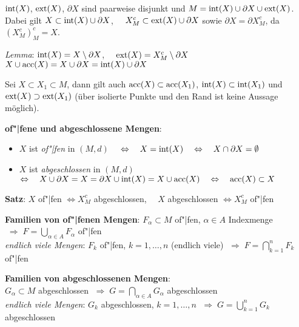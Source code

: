 \linie

$\operatorname{int}(X)$, $\operatorname{ext}(X)$, $\partial X$ sind paarweise disjunkt und
$M = \operatorname{int}(X) \cup \partial X \cup \operatorname{ext}(X)$. \\
Dabei gilt $X \subset \operatorname{int}(X) \cup \partial X$,
$\quad X_M^c \subset \operatorname{ext}(X) \cup \partial X$ \quad sowie
$\partial X = \partial X_M^c$, da $(X_M^c)_M^c = X$.

\emph{Lemma}: $\operatorname{int}(X) = X \setminus \partial X$,
$\quad\operatorname{ext}(X) = X_M^c \setminus \partial X$ \\
$X \cup \operatorname{acc}(X) = X \cup \partial X = \operatorname{int}(X) \cup \partial X$

Sei $X \subset X_1 \subset M$, dann gilt auch $\operatorname{acc}(X) \subset \operatorname{acc}(X_1)$,
$\operatorname{int}(X) \subset \operatorname{int}(X_1)$ und
$\operatorname{ext}(X) \supset \operatorname{ext}(X_1)$
(über isolierte Punkte und den Rand ist keine Aussage möglich).

\linie
\pagebreak

\textbf{of"|fene und abgeschlossene Mengen}:

\begin{itemize}
    \item $X$ ist \emph{of"|fen} in $(M,d)$
    $\quad\Leftrightarrow\quad X = \operatorname{int}(X) \quad\Leftrightarrow\quad
    X \cap \partial X = \emptyset$
    
    \item $X$ ist \emph{abgeschlossen} in $(M,d)$ \\
    $\Leftrightarrow\quad X \cup \partial X = X = 
    \partial X \cup \operatorname{int}(X) = X \cup \operatorname{acc}(X) \quad\Leftrightarrow\quad
    \operatorname{acc}(X) \subset X$
\end{itemize}

\textbf{Satz}: $X$ of"|fen $\Leftrightarrow X_M^c$ abgeschlossen,
$\quad X$ abgeschlossen $\Leftrightarrow X_M^c$ of"|fen

\textbf{Familien von of"|fenen Mengen}:
$F_\alpha \subset M$ of"|fen, $\alpha \in A$ Indexmenge
$\;\Rightarrow\; F = \bigcup_{\alpha \in A} F_\alpha$ of"|fen \\
\emph{endlich viele Mengen}:
$F_k$ of"|fen, $k = 1, \ldots, n$ (endlich viele)
$\;\Rightarrow\; F = \bigcap_{k=1}^n F_k$ of"|fen

\textbf{Familien von abgeschlossenen Mengen}: \\
$G_\alpha \subset M$ abgeschlossen
$\;\Rightarrow\; G = \bigcap_{\alpha \in A} G_\alpha$ abgeschlossen \\
\emph{endlich viele Mengen}:
$G_k$ abgeschlossen, $k = 1, \ldots, n$
$\;\Rightarrow\; G = \bigcup_{k=1}^n G_k$ abgeschlossen

